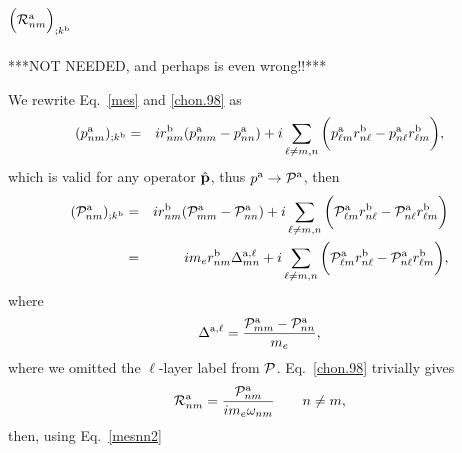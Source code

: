 \section{$\Big({\cal R}^{\mathrm{a}}_{nm}\Big)_{;k^{\mathrm{b}}}$}\label{calr}

***NOT NEEDED, and perhaps is even wrong!!***
 
We rewrite Eq.~\eqref{mes} and \eqref{chon.98} as
\begin{eqnarray}\label{mesnn}
(p^{\mathrm{a}}_{nm})_{;k^{\mathrm{b}}}&=& 
i 
r^{\mathrm{b}}_{nm}
(p^{\mathrm{a}}_{mm}-p^{\mathrm{a}}_{nn})
+i
\sum_{\ell\neq m,n}
\bigg( 
p^{\mathrm{a}}_{\ell m}
 r^{\mathrm{b}}_{n\ell}
- 
p^{\mathrm{a}}_{n\ell} 
r^{\mathrm{b}}_{\ell m}
\bigg)
,
\end{eqnarray} 
which is valid for any operator $\hat {\mathbf{p}}$, thus $p^{\mathrm{a}}\to{\cal
  P}^{\mathrm{a}}$, then
\begin{eqnarray}\label{mesnn2}
({\cal P}^{\mathrm{a}}_{nm})_{;k^{\mathrm{b}}}
&=&
i
r^{\mathrm{b}}_{nm}
({\cal P}^{\mathrm{a}}_{mm}-{\cal P}^{\mathrm{a}}_{nn})
+i
\sum_{\ell\neq m,n}
\bigg(
{\cal P}^{\mathrm{a}}_{\ell m}
 r^{\mathrm{b}}_{n\ell}
-
{\cal P}^{\mathrm{a}}_{n\ell}
r^{\mathrm{b}}_{\ell m}
\bigg)
\nonumber\\
&=&
im_e
r^{\mathrm{b}}_{nm}
\Delta^{\mathrm{a},\ell}_{mn}
+i
\sum_{\ell\neq m,n}
\bigg(
{\cal P}^{\mathrm{a}}_{\ell m}
 r^{\mathrm{b}}_{n\ell}
-
{\cal P}^{\mathrm{a}}_{n\ell}
r^{\mathrm{b}}_{\ell m}
\bigg)
,
\end{eqnarray}
where
\begin{equation}\label{l12}
\Delta^{\mathrm{a},\ell}
=\frac{{\cal P}^{\mathrm{a}}_{mm}-{\cal P}^{\mathrm{a}}_{nn}}{m_e}
,
\end{equation}
where we omitted the $\ell$-layer label from ${\cal P}$. 
Eq.~\eqref{chon.98} trivially gives
\begin{equation}\label{rnmenm69}
{\cal R}^{\mathrm{a}}_{nm}=\frac{{\cal P}^{\mathrm{a}}_{nm}}{im_e\omega_{nm}}
\quad\quad n\ne m
,
\end{equation}
then, using Eq.~\eqref{mesnn2}
